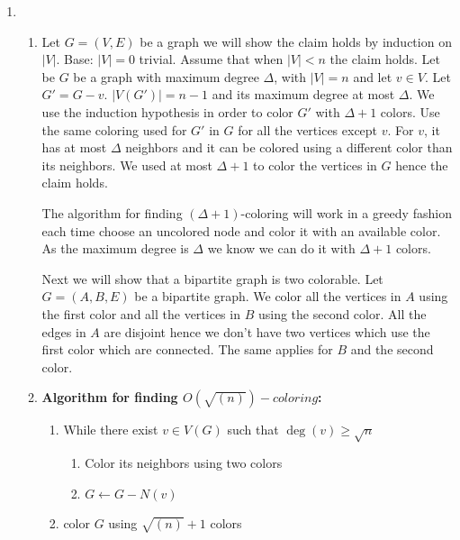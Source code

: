 \documentclass{article}
\begin{document}
\begin{enumerate}
\begin{proof}
	 By Claim~\ref{claim:le} we know that for any $c'$ defined over any $G_i$ we have:
	$$\sum_{e\in O} c'(e) \le OPT +\epsilon\cdot c^{G_i}_{max}$$ 
	Let $c_{j*}$ be the maximum cost of an edge in $O$. $O$ uses at least one edge of cost $c_{j*} = c^{G_{j*}}_{max}$ so for the $c'$ defined over $G_{j*}$ we have:
		$$\sum_{e\in O} c'(e)\le OPT +\epsilon\cdot c^{G_{j*}}_{max} \le (1 +\epsilon)OPT$$ 

Let $S$ be the solution our algorithm return. We have:
\begin{align*}
\sum_{e\in S} c(e) \le \sum_{e\in S} c'(e) \le \sum_{e\in O} c'(e)\le (1 +\epsilon)OPT
\end{align*}
Where the first inequality is due to the fact we ceil the costs and the second inequality is due to the fact we return min-cost solution under $c'$. 
\end{proof}
\item \begin{enumerate}
	\item Let $G=(V,E)$ be a graph we will show the claim holds by induction on $|V|$. Base: $|V| =0$ trivial. Assume that when $|V| < n$ the claim holds. Let be $G$ be a graph with maximum degree $\Delta$, with $|V|=n$ and let $v\in V$. Let $G' = G - v$. $|V(G')| = n - 1$ and its maximum degree at most $\Delta$. We use the induction hypothesis in order to color $G'$ with $\Delta + 1$ colors.
Use the same coloring used for $G'$ in $G$ for all the vertices except $v$. For $v$, it has at most $\Delta$ neighbors and it can be colored using a different color than its neighbors. We used at most $\Delta + 1$ to color the vertices in $G$ hence the claim holds.

The algorithm for finding $(\Delta+1)$-coloring will work in a greedy fashion each time choose an uncolored node and color it with an available color. As the maximum degree is $\Delta$ we know we can do it with $\Delta +1$ colors.

Next we will show that a bipartite graph is two colorable. Let $G = (A, B, E)$ be a bipartite graph. We color all the vertices in $A$ using the first color and all the vertices in $B$ using the second color. All the edges in $A$ are disjoint hence we don't have two vertices which use the first color which are connected. The same applies for $B$ and the second color.
	\item \textbf{Algorithm for finding $O(\sqrt{(n)})-coloring$:}
	\begin{enumerate}
		\item While there exist $v \in V(G)$ such that $\deg(v) \geq \sqrt{n}$
		\begin{enumerate}
			\item Color its neighbors using two colors
			\item $G \leftarrow G - N(v)$
		\end{enumerate}
		\item color $G$ using $\sqrt{(n)} + 1$ colors
	\end{enumerate}
	


\end{enumerate}
\end{enumerate}
\end{document}
